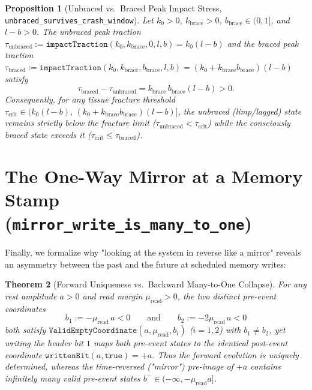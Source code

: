 \documentclass[11pt,a4paper]{article}
\newtheorem{theorem}{Theorem}[section]
\newtheorem{proposition}[theorem]{Proposition}
\theoremstyle{definition}
\begin{document}
\begin{proposition}[Unbraced vs.\ Braced Peak Impact Stress, \texttt{unbraced\_survives\_crash\_window}]
\label{prop:crash}
Let $k_0 > 0$, $k_{\mathrm{brace}} > 0$, $b_{\mathrm{brace}} \in (0, 1]$, and $l - b > 0$. The unbraced peak traction $\tau_{\mathrm{unbraced}} := \texttt{impactTraction}(k_0, k_{\mathrm{brace}}, 0, l, b) = k_0(l - b)$ and the braced peak traction $\tau_{\mathrm{braced}} := \texttt{impactTraction}(k_0, k_{\mathrm{brace}}, b_{\mathrm{brace}}, l, b) = (k_0 + k_{\mathrm{brace}}b_{\mathrm{brace}})(l - b)$ satisfy
\begin{equation}
  \tau_{\mathrm{braced}} - \tau_{\mathrm{unbraced}} = k_{\mathrm{brace}}\,b_{\mathrm{brace}}(l - b) > 0.
\end{equation}
Consequently, for any tissue fracture threshold $\tau_{\mathrm{crit}} \in \big(k_0(l - b),\, (k_0 + k_{\mathrm{brace}}b_{\mathrm{brace}})(l - b)\big]$, the unbraced (limp/lagged) state remains strictly below the fracture limit ($\tau_{\mathrm{unbraced}} < \tau_{\mathrm{crit}}$) while the consciously braced state exceeds it ($\tau_{\mathrm{crit}} \le \tau_{\mathrm{braced}}$).
\end{proposition}

\section{\texorpdfstring{The One-Way Mirror at a Memory Stamp (\texttt{mirror\_write\_is\_many\_to\_one})}{The One-Way Mirror at a Memory Stamp}}

Finally, we formalize why "looking at the system in reverse like a mirror" reveals an asymmetry between the past and the future at scheduled memory writes:

\begin{theorem}[Forward Uniqueness vs.\ Backward Many-to-One Collapse]
\label{thm:mirror}
For any rest amplitude $a > 0$ and read margin $\mu_{\mathrm{read}} > 0$, the two distinct pre-event coordinates
\begin{equation}
  b_1 := -\mu_{\mathrm{read}}\,a < 0 \qquad \text{and} \qquad b_2 := -2\mu_{\mathrm{read}}\,a < 0
\end{equation}
both satisfy $\texttt{ValidEmptyCoordinate}(a, \mu_{\mathrm{read}}, b_i)$ ($i=1,2$) with $b_1 \ne b_2$, yet writing the header bit $1$ maps both pre-event states to the identical post-event coordinate $\texttt{writtenBit}(a, \texttt{true}) = +a$. Thus the forward evolution is uniquely determined, whereas the time-reversed ("mirror") pre-image of $+a$ contains infinitely many valid pre-event states $b^- \in (-\infty, -\mu_{\mathrm{read}}a]$.
\end{theorem}
\end{document}
